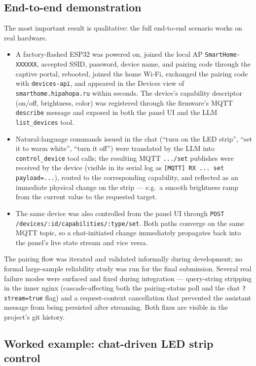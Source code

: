 \documentclass[a4paper,12pt]{article}
\begin{document}
\subsection{End-to-end demonstration}

The most important result is qualitative: the full end-to-end scenario works on real hardware.

\begin{itemize}
  \item A factory-flashed ESP32 was powered on, joined the local AP \verb|SmartHome-XXXXXX|, accepted SSID, password, device name, and pairing code through the captive portal, rebooted, joined the home Wi-Fi, exchanged the pairing code with \verb|devices-api|, and appeared in the Devices view of \verb|smarthome.hipahopa.ru| within seconds. The device's capability descriptor (on/off, brightness, color) was registered through the firmware's MQTT \verb|describe| message and exposed in both the panel UI and the LLM \verb|list_devices| tool.
  \item Natural-language commands issued in the chat (``turn on the LED strip'', ``set it to warm white'', ``turn it off'') were translated by the LLM into \verb|control_device| tool calls; the resulting MQTT \verb|.../set| publishes were received by the device (visible in its serial log as \verb|[MQTT] RX ... set payload=...|), routed to the corresponding capability, and reflected as an immediate physical change on the strip --- e.g.\ a smooth brightness ramp from the current value to the requested target.
  \item The same device was also controlled from the panel UI through \verb|POST /devices/:id/capabilities/:type/set|. Both paths converge on the same MQTT topic, so a chat-initiated change immediately propagates back into the panel's live state stream and vice versa.
\end{itemize}

The pairing flow was iterated and validated informally during development; no formal large-sample reliability study was run for the final submission. Several real failure modes were surfaced and fixed during integration --- query-string stripping in the inner nginx (cascade-affecting both the pairing-status poll and the chat \verb|?stream=true| flag) and a request-context cancellation that prevented the assistant message from being persisted after streaming. Both fixes are visible in the project's git history.

\subsection{Worked example: chat-driven LED strip control}
\label{sec:exp:worked}
\end{document}
